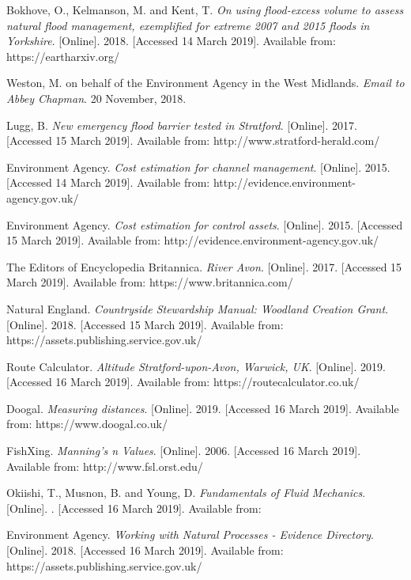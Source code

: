 \documentclass[11pt,a4paper]{article}
\begin{document}
\begin{thebibliography}{}
Bokhove, O., Kelmanson, M. and Kent, T. \textit{On using flood-excess volume to assess natural flood management, exemplified for extreme 2007 and 2015 floods in Yorkshire}. [Online]. 2018. [Accessed 14 March 2019]. Available from: https://eartharxiv.org/

Weston, M. on behalf of the Environment Agency in the West Midlands. \textit{Email to Abbey Chapman}. 20 November, 2018.

Lugg, B. \textit{New emergency flood barrier tested in Stratford}. [Online]. 2017. [Accessed 15 March 2019]. Available from: http://www.stratford-herald.com/

Environment Agency. \textit{Cost estimation for channel management}. [Online]. 2015. [Accessed 14 March 2019]. Available from: http://evidence.environment-agency.gov.uk/

Environment Agency. \textit{Cost estimation for control assets}. [Online]. 2015. [Accessed 15 March 2019]. Available from: http://evidence.environment-agency.gov.uk/

The Editors of Encyclopedia Britannica. \textit{River Avon}. [Online]. 2017. [Accessed 15 March 2019]. Available from:  https://www.britannica.com/

Natural England. \textit{Countryside Stewardship Manual: Woodland Creation Grant}. [Online]. 2018. [Accessed 15 March 2019]. Available from: https://assets.publishing.service.gov.uk/

Route Calculator. \textit{Altitude Stratford-upon-Avon, Warwick, UK}. [Online]. 2019. [Accessed 16 March 2019]. Available from: https://routecalculator.co.uk/

Doogal. \textit{Measuring distances}. [Online]. 2019. [Accessed 16 March 2019]. Available from: https://www.doogal.co.uk/

FishXing. \textit{Manning's n Values}. [Online]. 2006. [Accessed 16 March 2019]. Available from: http://www.fsl.orst.edu/

Okiishi, T., Musnon, B. and Young, D. \textit{Fundamentals of Fluid Mechanics}. [Online]. . [Accessed 16 March 2019]. Available from: 

Environment Agency. \textit{Working with Natural Processes - Evidence Directory}. [Online]. 2018. [Accessed 16 March 2019]. Available from: https://assets.publishing.service.gov.uk/


\end{thebibliography}
\end{document}
